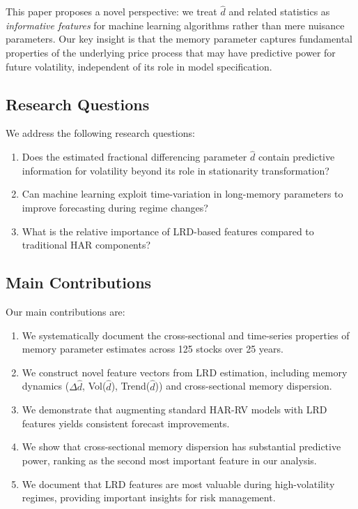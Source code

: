\documentclass[12pt,a4paper]{article}
\begin{document}
\vspace{0.3cm}
\noindent
This paper proposes a novel perspective: we treat $\hat{d}$ and related statistics as
\emph{informative features} for machine learning algorithms rather than mere nuisance
parameters. Our key insight is that the memory parameter captures fundamental properties of the underlying price process that may have predictive power for future volatility, independent of its role in model specification.

\subsection{Research Questions}

We address the following research questions:
\begin{enumerate}
    \item Does the estimated fractional differencing parameter $\hat{d}$ contain predictive information for volatility beyond its role in stationarity transformation?
    \item Can machine learning exploit time-variation in long-memory parameters to improve forecasting during regime changes?
    \item What is the relative importance of LRD-based features compared to traditional HAR components?
\end{enumerate}

\subsection{Main Contributions}

Our main contributions are:
\begin{enumerate}
    \item We systematically document the cross-sectional and time-series properties of memory parameter estimates across 125 stocks over 25 years.
    \item We construct novel feature vectors from LRD estimation, including memory dynamics ($\Delta\hat{d}$, Vol($\hat{d}$), Trend($\hat{d}$)) and cross-sectional memory dispersion.
    \item We demonstrate that augmenting standard HAR-RV models with LRD features yields consistent forecast improvements.
    \item We show that cross-sectional memory dispersion has substantial predictive power, ranking as the second most important feature in our analysis.
    \item We document that LRD features are most valuable during high-volatility regimes, providing important insights for risk management.
\end{enumerate}
\end{document}

